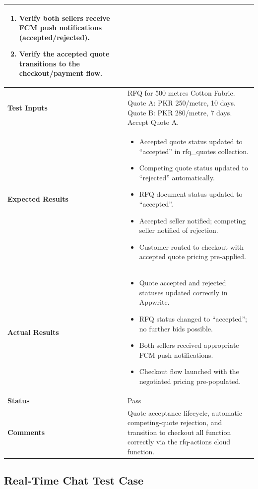 \begin{table}[H]
\begin{tabular}{|p{3.2cm}|p{10.8cm}|}
\begin{enumerate}[leftmargin=*,noitemsep]
\item Verify both sellers receive FCM push notifications (accepted/rejected).
\item Verify the accepted quote transitions to the checkout/payment flow.
\end{enumerate} \\ \hline
\textbf{Test Inputs} & RFQ for 500 metres Cotton Fabric. Quote A: PKR 250/metre, 10 days. Quote B: PKR 280/metre, 7 days. Accept Quote A. \\ \hline
\textbf{Expected Results} &
\begin{itemize}[leftmargin=*,noitemsep]
\item Accepted quote status updated to ``accepted'' in rfq\_quotes collection.
\item Competing quote status updated to ``rejected'' automatically.
\item RFQ document status updated to ``accepted''.
\item Accepted seller notified; competing seller notified of rejection.
\item Customer routed to checkout with accepted quote pricing pre-applied.
\end{itemize} \\ \hline
\textbf{Actual Results} &
\begin{itemize}[leftmargin=*,noitemsep]
\item Quote accepted and rejected statuses updated correctly in Appwrite.
\item RFQ status changed to ``accepted''; no further bids possible.
\item Both sellers received appropriate FCM push notifications.
\item Checkout flow launched with the negotiated pricing pre-populated.
\end{itemize} \\ \hline
\textbf{Status} & Pass \\ \hline
\textbf{Comments} & Quote acceptance lifecycle, automatic competing-quote rejection, and transition to checkout all function correctly via the rfq-actions cloud function. \\ \hline
\end{tabular}
\end{table}

\newpage
\subsection{Real-Time Chat Test Case}

